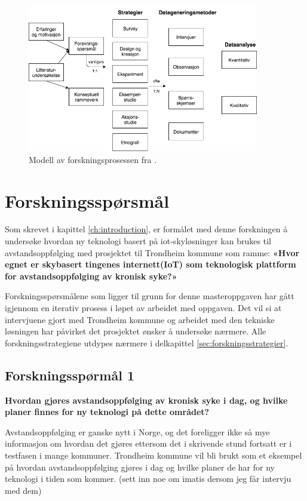 \begin{figure}
\centering
\includegraphics[width=0.90\textwidth]{fig/oates/oates_research_norwegian}
\caption{Modell av forskningsprosessen fra \citet{oates}.}
\label{fig:oates_model}
\end{figure}

\section{Forskningsspørsmål}
Som skrevet i kapittel \ref{ch:introduction}, er formålet med denne forskningen å undersøke hvordan ny teknologi basert
på \gls{iot}-skyløsninger kan brukes til avstandsoppfølging med prosjektet til Trondheim kommune som ramme:
\textbf{«Hvor egnet er skybasert tingenes internett(IoT) som teknologisk plattform for avstandsoppfølging av kronisk syke?»}

Forskningsspørsmålene som ligger til grunn for denne masteroppgaven har gått igjennom en iterativ prosess i løpet av arbeidet
med oppgaven. Det vil si at intervjuene gjort med Trondheim kommune og arbeidet med den tekniske løsningen har påvirket
det prosjektet ønsker å undersøke nærmere. Alle forskningsstrategiene utdypes nærmere i delkapittel \ref{sec:forskningsstrategier}.

\subsection{Forskningsspørmål 1}
\textbf{Hvordan gjøres avstandsoppfølging av kronisk syke i dag, og hvilke planer finnes for ny teknologi på dette området?}

Avstandsoppfølging er ganske nytt i Norge, og det foreligger ikke så mye informasjon om hvordan det gjøres ettersom
det i skrivende stund fortsatt er i testfasen i mange kommuner. Trondheim kommune vil bli brukt som et eksempel på hvordan avstandsoppfølging
gjøres i dag og hvilke planer de har for ny teknologi i tiden som kommer. (sett inn noe om imatis dersom jeg får intervju med dem)

